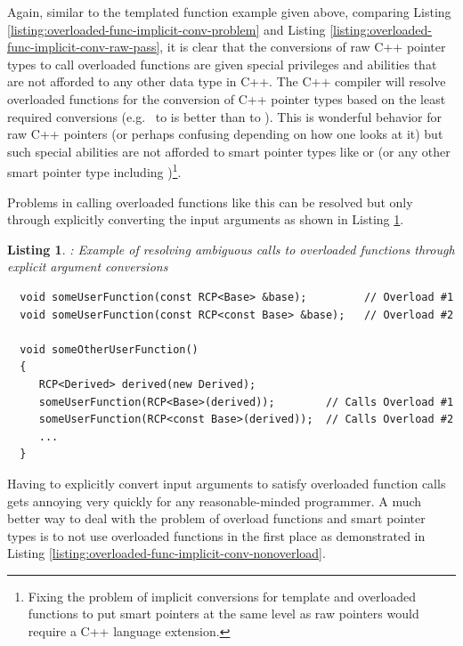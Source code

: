 \documentclass[pdf,ps2pdf,11pt]{SANDreport}
\newtheorem{listing}{Listing}
\begin{document}
Again, similar to the templated function example given above,
comparing Listing
{}\ref{listing:overloaded-func-implicit-conv-problem} and Listing
{}\ref{listing:overloaded-func-implicit-conv-raw-pass}, it is clear
that the conversions of raw C++ pointer types to call overloaded
functions are given special privileges and abilities that are not
afforded to any other data type in C++.  The C++ compiler will resolve
overloaded functions for the conversion of C++ pointer types based on
the least required conversions (e.g.\ {} to
{} is better than {} to {}).
This is wonderful behavior for raw C++ pointers (or perhaps confusing
depending on how one looks at it) but such special abilities are not
afforded to smart pointer types like {} or {} (or
any other smart pointer type including
{})\footnote{Fixing the problem of implicit
conversions for template and overloaded functions to put smart
pointers at the same level as raw pointers would require a C++
language extension.}.

Problems in calling overloaded functions like this can be resolved but
only through explicitly converting the input arguments as shown in
Listing {}\ref{listing:overloaded-func-implicit-conv-explicit-pass}.


{}\begin{listing}: Example of resolving ambiguous calls to overloaded
functions through explicit argument conversions
\label{listing:overloaded-func-implicit-conv-explicit-pass}
{\small\begin{verbatim}
  void someUserFunction(const RCP<Base> &base);         // Overload #1
  void someUserFunction(const RCP<const Base> &base);   // Overload #2

  void someOtherUserFunction()
  {
     RCP<Derived> derived(new Derived);
     someUserFunction(RCP<Base>(derived));        // Calls Overload #1
     someUserFunction(RCP<const Base>(derived));  // Calls Overload #2
     ...
  }
\end{verbatim}}
\end{listing}


Having to explicitly convert input arguments to satisfy overloaded
function calls gets annoying very quickly for any reasonable-minded
programmer.  A much better way to deal with the problem of overload
functions and smart pointer types is to not use overloaded functions in
the first place as demonstrated in Listing
{}\ref{listing:overloaded-func-implicit-conv-nonoverload}.
\end{document}
